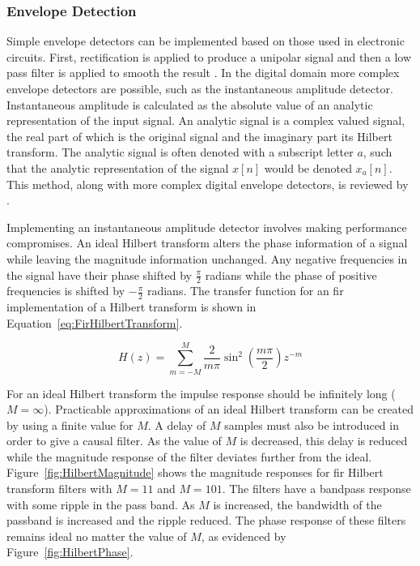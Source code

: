 		\subsubsection*{Envelope Detection}
			Simple envelope detectors can be implemented based on those used in electronic circuits. First,
			rectification is applied to produce a unipolar signal and then a low pass filter is applied to
			smooth the result \citep{dutilleux2011modulators}. In the digital domain more complex envelope
			detectors are possible, such as the instantaneous amplitude detector. Instantaneous amplitude is
			calculated as the absolute value of an analytic representation of the input signal. An analytic
			signal is a complex valued signal, the real part of which is the original signal and the imaginary
			part its Hilbert transform. The analytic signal is often denoted with a subscript letter $a$, such
			that the analytic representation of the signal $x[n]$ would be denoted $x_{a}[n]$. This method,
			along with more complex digital envelope detectors, is reviewed by \citet{chang2007a}. 

			Implementing an instantaneous amplitude detector involves making performance compromises. An ideal
			Hilbert transform alters the phase information of a signal while leaving the magnitude information
			unchanged. Any negative frequencies in the signal have their phase shifted by $\frac{\pi}{2}$
			radians while the phase of positive frequencies is shifted by $-\frac{\pi}{2}$ radians. The
			transfer function for an \acrshort{fir} implementation of a Hilbert transform is shown in
			Equation~\ref{eq:FirHilbertTransform}.

			\begin{equation}
				H(z) = \sum_{m = -M}^{M} \frac{2}{m\pi} \sin^{2} \left( \frac{m\pi}{2} \right) z^{-m}
				\label{eq:FirHilbertTransform}
			\end{equation}

			For an ideal Hilbert transform the impulse response should be infinitely long ($M = \infty$).
			Practicable approximations of an ideal Hilbert transform can be created by using a finite value for
			$M$. A delay of $M$ samples must also be introduced in order to give a causal filter. As the value
			of $M$ is decreased, this delay is reduced while the magnitude response of the filter deviates
			further from the ideal. Figure~\ref{fig:HilbertMagnitude} shows the magnitude responses for
			\acrshort{fir} Hilbert transform filters with $M = 11$ and $M = 101$. The filters have a bandpass
			response with some ripple in the pass band. As $M$ is increased, the bandwidth of the passband is
			increased and the ripple reduced. The phase response of these filters remains ideal no matter the
			value of $M$, as evidenced by Figure~\ref{fig:HilbertPhase}.

